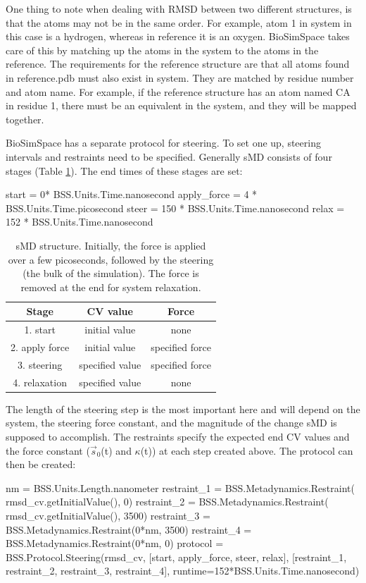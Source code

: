One thing to note when dealing with RMSD between two different structures, is that the atoms may not be in the same order. For example, atom 1 in system in this case is a hydrogen, whereas in reference it is an oxygen. BioSimSpace takes care of this by matching up the atoms in the system to the atoms in the reference. The requirements for the reference structure are that all atoms found in reference.pdb must also exist in system. They are matched by residue number and atom name. For example, if the reference structure has an atom named CA in residue 1, there must be an equivalent in the system, and they will be mapped together.

BioSimSpace has a separate protocol for steering. To set one up, steering intervals and restraints need to be specified. Generally sMD consists of four stages (Table \ref{sMD-structure}). The end times of these stages are set:
\begin{python}
start = 0* BSS.Units.Time.nanosecond
apply_force = 4 * BSS.Units.Time.picosecond
steer = 150 * BSS.Units.Time.nanosecond
relax = 152 * BSS.Units.Time.nanosecond
\end{python}

\begin{table}
    \caption{sMD structure. Initially, the force is applied over a few picoseconds, followed by the steering (the bulk of the simulation). The force is removed at the end for system relaxation.}
    \label{sMD-structure}
    \begin{tabular}{|c|c|c|}
    \hline
       Stage  &  CV value  &  Force  \\
       \hline
        1. start  &  initial value  &  none \\
        \hline
        2. apply force  &  initial value  &  specified force  \\
        \hline
        3. steering  &  specified value  &  specified force  \\
        \hline
        4. relaxation  &  specified value  & none  \\
        \hline
    \end{tabular}
\end{table}

The length of the steering step is the most important here and will depend on the system, the steering force constant, and the magnitude of the change sMD is supposed to accomplish. The restraints specify the expected end CV values and the force constant ($\vec{s}_0$(t) and $\kappa$(t)) at each step created above. The protocol can then be created:
\begin{python}
nm = BSS.Units.Length.nanometer
restraint_1 = BSS.Metadynamics.Restraint(
                rmsd_cv.getInitialValue(), 0)
restraint_2 = BSS.Metadynamics.Restraint(
                rmsd_cv.getInitialValue(), 3500)
restraint_3 = BSS.Metadynamics.Restraint(0*nm, 3500)
restraint_4 = BSS.Metadynamics.Restraint(0*nm, 0)
protocol = BSS.Protocol.Steering(rmsd_cv, 
        [start, apply_force, steer, relax], 
        [restraint_1, restraint_2, restraint_3, restraint_4], 
        runtime=152*BSS.Units.Time.nanosecond)
\end{python}

